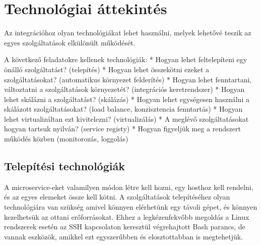 \documentclass[11pt,magyar,a4paper,oneside,]{report}
\begin{document}
\chapter{Technológiai
áttekintés}\label{technoluxf3giai-uxe1ttekintuxe9s}

Az integrációhoz olyan technológiákat lehet használni, melyek lehetővé
teszik az egyes szolgáltatások elkülönült működését.

A következő feladatokre kellenek technológiák: * Hogyan lehet
feltelepíteni egy önálló szolgáltatást? (telepítés) * Hogyan lehet
összekötni ezeket a szolgáltatásokat? (automatikus környezet felderítés)
* Hogyan lehet fenntartani, változtatni a szolgáltatások környezetét?
(integrációs keretrendszer) * Hogyan lehet skálázni a szolgáltatást?
(skálázás) * Hogyan lehet egységesen használni a skálázott
szolgáltatásokat? (load balance, konzisztencia fenntartás) * Hogyan
lehet virtualizáltan ezt kivitelezni? (virtualizálás) * A meglévő
szolgáltatásokat hogyan tartsuk nyilván? (service registy) * Hogyan
figyeljük meg a rendszert működés közben (monitorozás, loggolás)

\section{Telepítési
technológiák}\label{telepuxedtuxe9si-technoluxf3giuxe1k}

A microservice-eket valamilyen módon létre kell hozni, egy hosthoz kell
rendelni, és az egyes elemeket össze kell kötni. A szolgáltatások
telepítéséhez olyan technológiára van szükség amivel könnyen elérhetünk
egy távoli gépet, és könnyen kezelhetsük az ottani erőforrásokat. Ehhez
a legkézenfekvőbb megoldás a Linux rendszerek esetén az SSH kapcsolaton
keresztül végrehajtott Bash parancs, de vannak eszközök, amikkel ezt
egyszerűbben és elosztottabban is megtehetjük.
\end{document}
